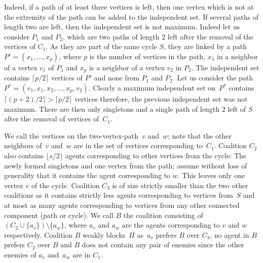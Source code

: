 \documentclass[a4paper,fleqn]{cas-sc}
\newcommand{\agents}{agents\xspace}
\newcommand{\partition}{\ensuremath{\Pi}\xspace}
\newcommand{\coalition}{\ensuremath{C}\xspace}
\newcommand{\blockingCoalition}{\ensuremath{B}\xspace}
\begin{document}
{   Indeed, if a path of at least three vertices is left, then one vertex which is not at the extremity of the path can be added to the independent set. 
   If several paths of length two are left, then the independent set is not maximum. 
   Indeed let us consider $P_1$ and $P_2$, which are two paths of length $2$ left after the removal of the vertices of $\coalition_1$. As they are part of the same cycle $S$, they are linked by a path $P'=(x_1, \dots,x_p)$, where $p$ is the number of vertices in the path, $x_1$ in a neighbor of a vertex $v_1$ of $P_1$ and $x_p$ is a neighbor of a vertex $v_2$ in $P_2$. 
   The independent set contains $\lceil p/2 \rceil$ vertices of $P'$ and none from $P_1$ and $P_2$. Let us consider the path $P^*=(v_1,x_1,x_2, \dots, x_p, v_2)$. Clearly a maximum independent set on~$P^*$ contains $\lceil (p+2)/2 \rceil > \lceil p/2 \rceil$ vertices therefore, the previous independent set was not maximum. There are then only singletons and a single path of length $2$ left of $S$ after the removal of vertices of~$\coalition_1$.   
   
   We call the vertices on the two-vertex-path~$v$ and~$w$; note that the other neighbors of~$v$ and~$w$ are in the set of vertices corresponding to~$\coalition_1$. Coalition $\coalition_2$ also contains $\lfloor s/2 \rfloor$ \agents corresponding to other vertices from the cycle: The newly formed singletons and one vertex from the path; assume without loss of generality that it contains the agent corresponding to $w$. This leaves only one vertex $v$ of the cycle. 
   Coalition $\coalition_3$ is of size strictly smaller than the two other coalitions as it contains strictly less \agents corresponding to vertices from~$S$ and at most as many \agents corresponding to vertices from any other connected component (path or cycle). 
   We call $\blockingCoalition$ the coalition consisting of $(\coalition_2 \cup \{a_v\}) \setminus \{a_w\}$, where $a_v$ and $a_w$ are the agents corresponding to $v$ and $w$ respectively. Coalition \blockingCoalition weakly blocks~\partition as~$a_v$ prefers \blockingCoalition over $\coalition_3$, no agent in \blockingCoalition prefers $\coalition_2$ over \blockingCoalition and \blockingCoalition does not contain any pair of enemies since the other enemies of $a_v$ and~$a_w$ are in $\coalition_1$.\\

}
\end{document}

